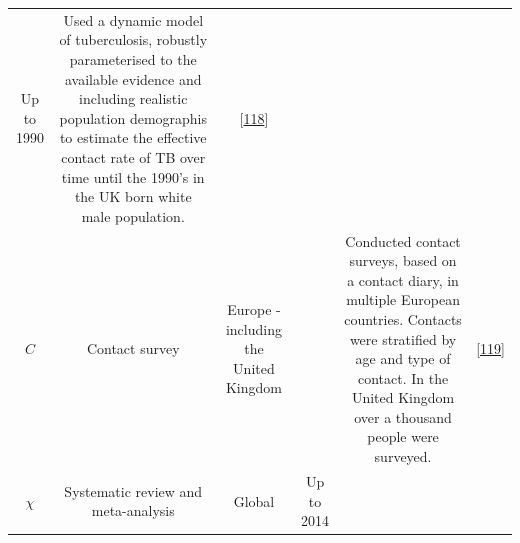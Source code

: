 \documentclass[11pt,twoside]{bristolthesis}
\begin{document}
\begin{longtable}[]{@{}cccccc@{}}
\begin{minipage}[t]{0.07\columnwidth}
  Up to
  1990\strut
  \end{minipage} & \begin{minipage}[t]{0.31\columnwidth}\centering
  Used a dynamic model of tuberculosis, robustly
  parameterised to the available evidence and
  including realistic population demographis to
  estimate the effective contact rate of TB over
  time until the 1990's in the UK born white male
  population.\strut
  \end{minipage} & \begin{minipage}[t]{0.10\columnwidth}\centering
  {[}\protect\hyperlink{ref-Vynnycky1999}{118}{]}\strut
  \end{minipage}\tabularnewline
  \begin{minipage}[t]{0.19\columnwidth}\centering
  \(C\)\strut
  \end{minipage} & \begin{minipage}[t]{0.09\columnwidth}\centering
  Contact
  survey\strut
  \end{minipage} & \begin{minipage}[t]{0.07\columnwidth}\centering
  Europe -
  including
  the
  United
  Kingdom\strut
  \end{minipage} & \begin{minipage}[t]{0.07\columnwidth}\centering
  2005\strut
  \end{minipage} & \begin{minipage}[t]{0.31\columnwidth}\centering
  Conducted contact surveys, based on a contact
  diary, in multiple European countries. Contacts
  were stratified by age and type of contact. In the
  United Kingdom over a thousand people were
  surveyed.\strut
  \end{minipage} & \begin{minipage}[t]{0.10\columnwidth}\centering
  {[}\protect\hyperlink{ref-Mossong2008}{119}{]}\strut
  \end{minipage}\tabularnewline
  \begin{minipage}[t]{0.19\columnwidth}\centering
  \(\chi\)\strut
  \end{minipage} & \begin{minipage}[t]{0.09\columnwidth}\centering
  Systematic
  review and
  meta-analysis\strut
  \end{minipage} & \begin{minipage}[t]{0.07\columnwidth}\centering
  Global\strut
  \end{minipage} & \begin{minipage}[t]{0.07\columnwidth}\centering
  Up to
  2014\strut

\end{minipage}
\end{longtable}
\end{document}
